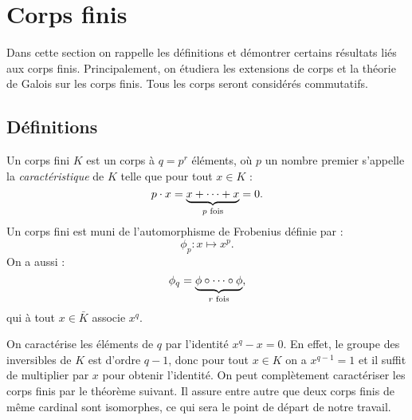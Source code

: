 \documentclass[a4paper]{article} %
\numberwithin{section}{part}
\numberwithin{equation}{section}
\begin{document}
\section{Corps finis}
Dans cette section on rappelle les définitions et démontrer certains 
résultats liés aux corps finis. Principalement, on étudiera les extensions 
de corps et la théorie de Galois sur les corps finis. Tous les corps seront
considérés commutatifs. 

\subsection{Définitions}
Un corps fini $K$ est un corps à $q = p^r$ éléments, où $p$ un nombre premier
s'appelle la \emph{caractéristique} de $K$ telle que pour tout $x\in K$ :
\begin{equation}
p\cdot x = \underbrace{x+\dots+x}_{p\textup{ fois}} = 0.
\end{equation}
Un corps fini est muni de l'automorphisme de Frobenius définie par :
\begin{equation}
\phi_p : x \mapsto x^p.
\end{equation}
On a aussi :
\begin{equation}
\phi_q = \underbrace{\phi\circ\cdots\circ\phi}_{r\textup{
fois}},
\end{equation}
qui à tout $x\in \bar{K}$ associe $x^q$.\par
On caractérise les éléments de $q$ par l'identité $x^q - x = 0$. En effet, le
groupe des inversibles de $K$ est d'ordre $q-1$, donc pour tout $x\in K$ on a
$x^{q-1} = 1$ et il suffit de multiplier par $x$ pour obtenir l'identité.
On peut complètement caractériser les corps finis par le théorème suivant. Il
assure entre autre que deux corps finis de même cardinal sont isomorphes, ce qui
sera le point de départ de notre travail.
\end{document}
